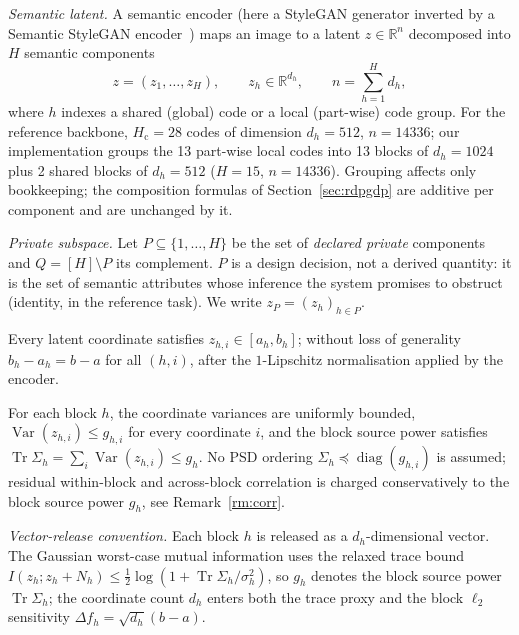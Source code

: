 \emph{Semantic latent.} A semantic encoder (here a StyleGAN generator inverted
by a Semantic StyleGAN encoder~\cite{semanticstylegan}) maps an image to a
latent $z\in\mathbb{R}^{n}$ decomposed into $H$ semantic components
\begin{equation}
 z=(z_1,\dots,z_H),\qquad z_h\in\mathbb{R}^{d_h},\qquad
 n=\textstyle\sum_{h=1}^{H} d_h ,
\label{eq:decomp}
\end{equation}
where $h$ indexes a shared (global) code or a local (part-wise) code group.
For the reference backbone, $H_{\mathrm c}=28$ codes of dimension
$d_h=512$, $n=14336$; our implementation groups the 13 part-wise local codes
into 13 blocks of $d_h=1024$ plus 2 shared blocks of $d_h=512$ ($H=15$,
$n=14336$). Grouping affects only bookkeeping; the composition formulas of
Section~\ref{sec:rdpgdp} are additive per component and are unchanged by it.

\emph{Private subspace.} Let $P\subseteq\{1,\dots,H\}$ be the set of
\emph{declared private} components and $Q=[H]\setminus P$ its complement.
$P$ is a design decision, not a derived quantity: it is the set of semantic
attributes whose inference the system promises to obstruct (identity, in the
reference task). We write $z_P=(z_h)_{h\in P}$.

\begin{assumption}
\label{as:range}
Every latent coordinate satisfies $z_{h,i}\in[a_h,b_h]$; without loss of
generality $b_h-a_h=b-a$ for all $(h,i)$, after the $1$-Lipschitz
normalisation applied by the encoder.
\end{assumption}

\begin{assumption}
\label{as:indep}
For each block $h$, the coordinate variances are uniformly bounded,
$\operatorname{Var}(z_{h,i})\le g_{h,i}$ for every coordinate $i$, and the
block source power satisfies
$\operatorname{Tr}\Sigma_h=\sum_i\operatorname{Var}(z_{h,i})\le g_h$. No PSD
ordering $\Sigma_h\preceq\operatorname{diag}(g_{h,i})$ is assumed; residual
within-block and across-block correlation is charged conservatively to the
block source power $g_h$, see Remark~\ref{rm:corr}.
\end{assumption}

\emph{Vector-release convention.} Each block $h$ is released as a
$d_h$-dimensional vector. The Gaussian worst-case mutual information uses the
relaxed trace bound
$I(z_h;z_h+N_h)\le\tfrac12\log(1+\operatorname{Tr}\Sigma_h/\sigma_h^2)$, so
$g_h$ denotes the block source power $\operatorname{Tr}\Sigma_h$; the
coordinate count $d_h$ enters both the trace proxy and the block $\ell_2$
sensitivity $\Delta f_h=\sqrt{d_h}(b-a)$.

